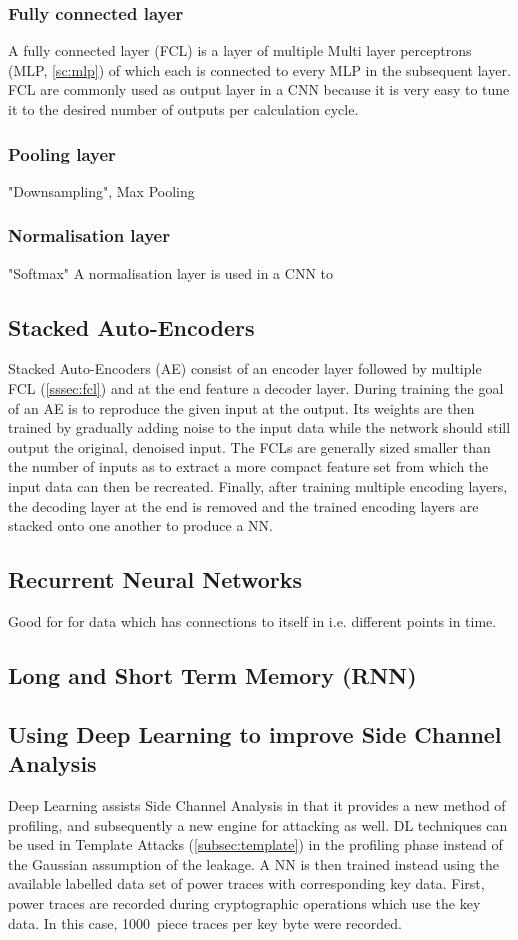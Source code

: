 \documentclass[journal]{IEEEtran}
\begin{document}
\subsubsection{Fully connected layer}
\label{sssec:fcl}
A fully connected layer (FCL) is a layer of multiple Multi layer perceptrons (MLP, \autoref{sc:mlp}) of which each is connected to every MLP in the subsequent layer. FCL are commonly used as output layer in a CNN because it is very easy to tune it to the desired number of outputs per calculation cycle.

\subsubsection{Pooling layer}
"Downsampling", Max Pooling
\subsubsection{Normalisation layer}
"Softmax" A normalisation layer is used in a CNN to 

\subsection{Stacked Auto-Encoders}
Stacked Auto-Encoders (AE) consist of an encoder layer followed by multiple FCL (\autoref{sssec:fcl}) and at the end feature a decoder layer. During training the goal of an AE is to reproduce the given input at the output. Its weights are then trained by gradually adding noise to the input data while the network should still output the original, denoised input. The FCLs are generally sized smaller than the number of inputs as to extract a more compact feature set from which the input data can then be recreated. Finally, after training multiple encoding layers, the decoding layer at the end is removed and the trained encoding layers are stacked onto one another to produce a NN. %

\subsection{Recurrent Neural Networks}
Good for for data which has connections to itself in i.e. different points in time.
\subsection{Long and Short Term Memory (RNN)}

\subsection{Using Deep Learning to improve Side Channel Analysis}
Deep Learning assists Side Channel Analysis in that it provides a new method of profiling, and subsequently a new engine for attacking as well. DL techniques can be used in Template Attacks (\autoref{subsec:template}) in the profiling phase instead of the Gaussian assumption of the leakage. A NN is then trained instead using the available labelled data set of power traces with corresponding key data. First, power traces are recorded during cryptographic operations which use the key data. In this case, \SI{1000}{piece} traces per key byte were recorded. 
\end{document}
